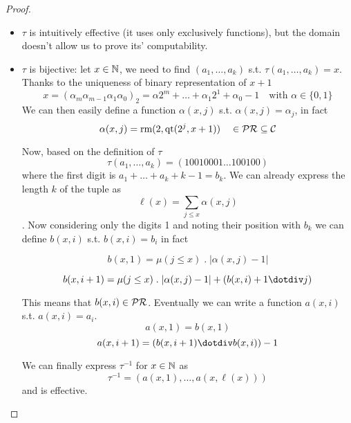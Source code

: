 \begin{lemma}
\begin{proof}
\begin{enumerate}[label=(\arabic*)]
{        \begin{itemize}
        \item $\tau$ is intuitively effective (it uses only
          exclusively functions), but the domain doesn't allow us to
          prove its' computability.
        \item $\tau$ is bijective: let $x \in \mathbb{N}$, we need to find
          $(a_1, \dots, a_k)$ s.t. $\tau(a_1,\dots,a_k) = x$. Thanks
          to the uniqueness of binary representation of $x+1$
          \[x = (\alpha_m \alpha_{m-1} \alpha_1 \alpha_0)_2 = \alpha
            2^m + \dots + \alpha_1 2^1 + \alpha_0 - 1 \quad \text{with
            } \alpha \in \{0,1\} \] We can then easily define a
          function $\alpha(x,j)$ s.t. $\alpha(x,j) = \alpha_j$, in
          fact
          \[\alpha(x, j) = \text{rm}(2, \text{qt}(2^j, x+1)) \quad \in
            \mathcal{PR} \subseteq \mathcal{C}\]

          Now, based on the definition of $\tau$
          \[\tau(a_1, \dots, a_k) = (1 0 0 1 0 0 0 1 \dots 1 0 0 1 0
            0)\] where the first digit is $a_1+\dots+a_k+k-1 =
          b_k$. We can already express the length $k$ of the tuple
          as \[\ell (x) = \sum_{j \leq x}\alpha(x,j)\]. Now considering
          only the digits 1 and noting their position with $b_k$ we
          can define $b(x,i)$ s.t. $b(x,i) = b_i$ in fact

          \[b(x,1) = \mu(j \leq x) \; . \; |\alpha(x,j) - 1|\]

          \[b(x,i+1) = \mu(j \leq x) \; . \; |\alpha(x,j)-1| +
            (b(x,i)+1 \dotdiv j)\]

          This means that $b(x,i)\in \mathcal{PR}$.  Eventually we can write a
          function $a(x,i)$ s.t. $a(x,i) = a_i$.
          \[a(x,1) = b(x,1)\]
          \[a(x,i+1) = (b(x,i+1) \dotdiv b(x,i))-1\]

          We can finally express $\tau^{-1}$ for $x \in \mathbb{N}$ as
          \[\tau^{-1} = (a(x,1), \dots, a(x, \ell(x)))\] and is
          effective.
        \end{itemize}
    \fi
    
    
       
      }
    \end{enumerate}
  \end{proof}
\end{lemma}

